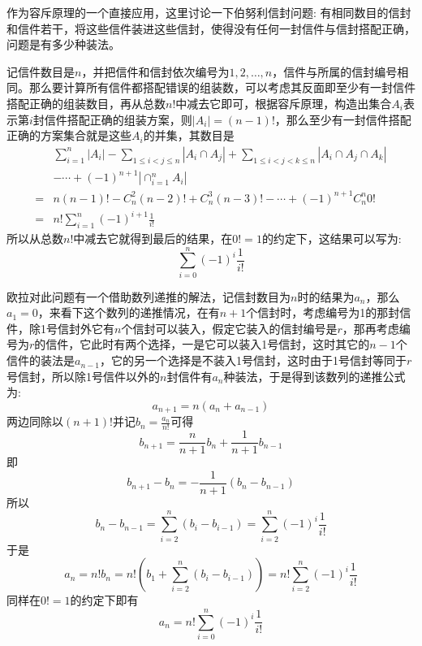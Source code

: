 \begin{example}
  作为容斥原理的一个直接应用，这里讨论一下伯努利信封问题: 有相同数目的信封和信件若干，将这些信件装进这些信封，使得没有任何一封信件与信封搭配正确，问题是有多少种装法。

  记信件数目是$n$，并把信件和信封依次编号为$1,2,\ldots,n$，信件与所属的信封编号相同。那么要计算所有信件都搭配错误的组装数，可以考虑其反面即至少有一封信件搭配正确的组装数目，再从总数$n!$中减去它即可，根据容斥原理，构造出集合$A_i$表示第$i$封信件搭配正确的组装方案，则$|A_i|=(n-1)!$，那么至少有一封信件搭配正确的方案集合就是这些$A_i$的并集，其数目是
  \begin{equation*}
    \begin{split}
      &    \sum_{i=1}^n|A_i|-\sum_{1\leqslant i <j \leqslant n}|A_i \cap A_j|+\sum_{1 \leqslant i <j <k \leqslant n}|A_i\cap A_j \cap A_k| \\
      & -\cdots+(-1)^{n+1}|\cap_{i=1}^nA_i| \\
      = & n (n-1)! - C_n^2(n-2)! + C_n^3(n-3)! - \cdots + (-1)^{n+1}C_n^n0! \\
      = & n!\sum_{i=1}^n(-1)^{i+1}\frac{1}{i!}
    \end{split}
  \end{equation*}
  所以从总数$n!$中减去它就得到最后的结果，在$0!=1$的约定下，这结果可以写为:
  \begin{equation}
    \label{eq:bernoulli-envelope-problem-solution}
    \sum_{i=0}^n(-1)^i \frac{1}{i!}
  \end{equation}

  欧拉对此问题有一个借助数列递推的解法，记信封数目为$n$时的结果为$a_n$，那么$a_1=0$，来看下这个数列的递推情况，在有$n+1$个信封时，考虑编号为1的那封信件，除1号信封外它有$n$个信封可以装入，假定它装入的信封编号是$r$，那再考虑编号为$r$的信件，它此时有两个选择，一是它可以装入1号信封，这时其它的$n-1$个信件的装法是$a_{n-1}$，它的另一个选择是不装入1号信封，这时由于1号信封等同于$r$号信封，所以除1号信件以外的$n$封信件有$a_n$种装法，于是得到该数列的递推公式为:
  \begin{equation*}
    a_{n+1}=n(a_n+a_{n-1})
  \end{equation*}
  两边同除以$(n+1)!$并记$b_n=\frac{a_n}{n!}$可得
  \begin{equation*}
    b_{n+1}=\frac{n}{n+1}b_n+\frac{1}{n+1}b_{n-1}
  \end{equation*}
  即
  \begin{equation*}
    b_{n+1}-b_n=-\frac{1}{n+1}(b_n-b_{n-1})
  \end{equation*}
  所以
  \begin{equation*}
    b_n-b_{n-1}= \sum_{i=2}^{n}(b_i-b_{i-1})= \sum_{i=2}^n (-1)^{i}\frac{1}{i!}
  \end{equation*}
  于是
  \begin{equation*}
    a_n= n!b_n = n!(b_1 + \sum_{i=2}^n(b_i-b_{i-1})) = n! \sum_{i=2}^n(-1)^{i}\frac{1}{i!}
  \end{equation*}
  同样在$0!=1$的约定下即有
  \begin{equation*}
    a_n = n!\sum_{i=0}^n(-1)^{i}\frac{1}{i!}
  \end{equation*}
\end{example}

